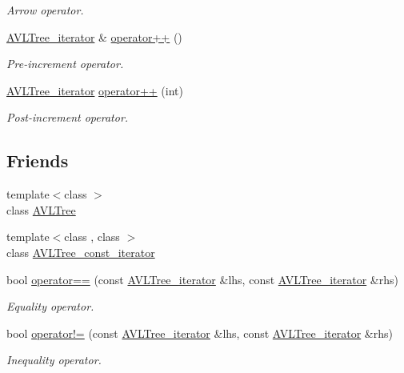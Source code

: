 \begin{DoxyCompactItemize}
\begin{DoxyCompactList}\small\item\em Arrow operator. \end{DoxyCompactList}\item 
\hyperlink{class_a_v_l_tree__iterator}{A\+V\+L\+Tree\+\_\+iterator} \& \hyperlink{class_a_v_l_tree__iterator_a66da49835f9ef7d848c03ca4891d2e38}{operator++} ()
\begin{DoxyCompactList}\small\item\em Pre-\/increment operator. \end{DoxyCompactList}\item 
\hyperlink{class_a_v_l_tree__iterator}{A\+V\+L\+Tree\+\_\+iterator} \hyperlink{class_a_v_l_tree__iterator_a2b089f2be379782a8a7fb3021207e28b}{operator++} (int)
\begin{DoxyCompactList}\small\item\em Post-\/increment operator. \end{DoxyCompactList}\end{DoxyCompactItemize}
\subsection*{Friends}
\begin{DoxyCompactItemize}
\item 
{\footnotesize template$<$class $>$ }\\class \hyperlink{class_a_v_l_tree__iterator_aa926bd8d1e26ee32ade14a311ebf8df5}{A\+V\+L\+Tree}
\item 
{\footnotesize template$<$class , class $>$ }\\class \hyperlink{class_a_v_l_tree__iterator_afe091ef781f649e6f53c487b80a067f1}{A\+V\+L\+Tree\+\_\+const\+\_\+iterator}
\item 
bool \hyperlink{class_a_v_l_tree__iterator_a45d6200909fd4d5e6f7e7084ef428d34}{operator==} (const \hyperlink{class_a_v_l_tree__iterator}{A\+V\+L\+Tree\+\_\+iterator} \&lhs, const \hyperlink{class_a_v_l_tree__iterator}{A\+V\+L\+Tree\+\_\+iterator} \&rhs)
\begin{DoxyCompactList}\small\item\em Equality operator. \end{DoxyCompactList}\item 
bool \hyperlink{class_a_v_l_tree__iterator_a32ea0c466c92a1554c309cd332712c66}{operator!=} (const \hyperlink{class_a_v_l_tree__iterator}{A\+V\+L\+Tree\+\_\+iterator} \&lhs, const \hyperlink{class_a_v_l_tree__iterator}{A\+V\+L\+Tree\+\_\+iterator} \&rhs)
\begin{DoxyCompactList}\small\item\em Inequality operator. \end{DoxyCompactList}\end{DoxyCompactItemize}


